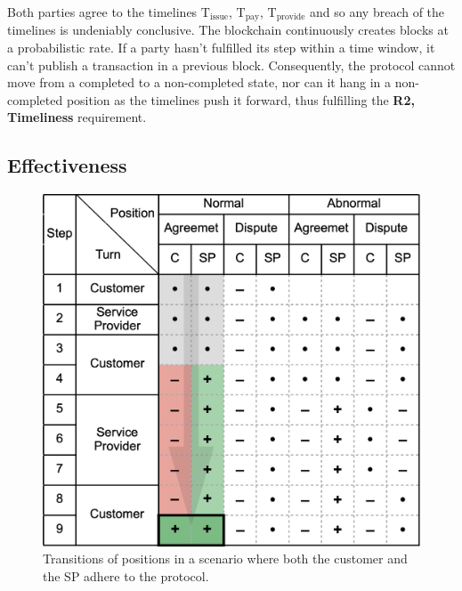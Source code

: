 \documentclass[pdftex,twocolumn,epjc3]{svjour3}
\begin{document}
Both parties agree to the timelines $\mathrm{T}_\mathrm{issue}$, $\mathrm{T}_\mathrm{pay}$, $\mathrm{T}_\mathrm{provide}$ and so any breach of the timelines is undeniably conclusive. The blockchain continuously creates blocks at a probabilistic rate. If a party hasn't fulfilled its step within a time window, it can't publish a transaction in a previous block. Consequently, the protocol cannot move from a completed to a non-completed state, nor can it hang in a non-completed position as the timelines push it forward, thus fulfilling the \textbf{R2, Timeliness} requirement.




\subsection{Effectiveness}

\begin{figure}[h!]
\includegraphics[width=\linewidth]{rational.png}
\centering
\caption{Transitions of positions in a scenario where both the customer and the SP adhere to the protocol.}
\label{fig:rational}
\end{figure}
\end{document}
